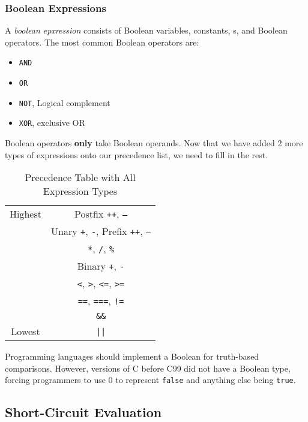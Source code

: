 \subsubsection{Boolean Expressions}\label{subsubsec:Boolean_Expressions}
\begin{definition}\label{def:Boolean_Expression}
  A \emph{boolean epxression} consists of Boolean variables, constants, s, and Boolean operators.
  The most common Boolean operators are:
  \begin{itemize}[noitemsep]
  \item \texttt{AND}
  \item \texttt{OR}
  \item \texttt{NOT}, Logical complement
  \item \texttt{XOR}, exclusive OR
  \end{itemize}
\end{definition}

Boolean operators \textbf{only} take Boolean operands.
Now that we have added 2 more types of expressions onto our precedence list, we need to fill in the rest.

\begin{table}[h!]
  \centering
  \begin{tabular}{cc}
    \toprule
    Highest & Postfix \texttt{++}, \texttt{--} \\
            & Unary \texttt{+}, \texttt{-}, Prefix \texttt{++}, \texttt{--} \\
            & \texttt{*}, \texttt{/}, \texttt{\%} \\
            & Binary \texttt{+}, \texttt{-} \\
            & \texttt{<}, \texttt{>}, \texttt{<=}, \texttt{>=} \\
            & \texttt{==}, \texttt{===}, \texttt{!=} \\
            & \texttt{\&\&} \\
    Lowest & \texttt{||} \\
    \bottomrule
  \end{tabular}
  \caption{Precedence Table with All Expression Types}
  \label{tab:Precedence_Table_with_All_Expression_Types}
\end{table}

Programming languages should implement a Boolean  for truth-based comparisons.
However, versions of C before C99 did not have a Boolean type, forcing programmers to use 0 to represent \texttt{false} and anything else being \texttt{true}.

\subsection{Short-Circuit Evaluation}\label{subsec:Short_Circuit_Evaluation}

